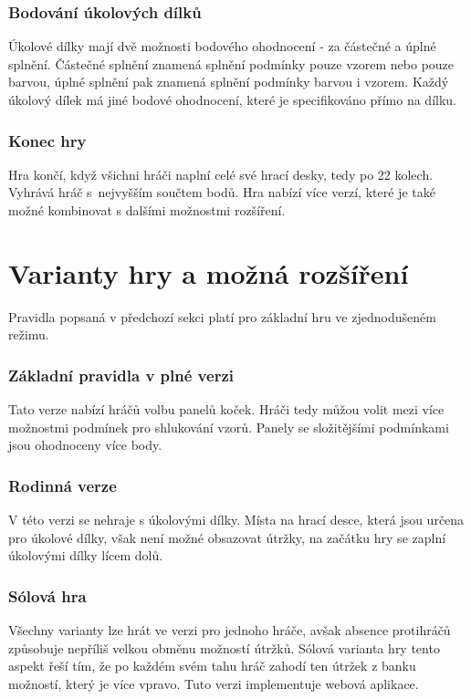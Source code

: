 \subsubsection*{Bodování úkolových dílků}
Úkolové dílky mají dvě možnosti bodového ohodnocení - za částečné a úplné splnění. Částečné splnění znamená splnění podmínky pouze vzorem nebo pouze barvou, úplné splnění pak znamená splnění podmínky barvou i vzorem. Každý úkolový dílek má jiné bodové ohodnocení, které je specifikováno přímo na dílku.


\subsubsection*{Konec hry}

Hra končí, když všichni hráči naplní celé své hrací desky, tedy po 22 kolech. Vyhrává hráč s~nejvyšším součtem bodů. Hra nabízí více verzí, které je také možné kombinovat s dalšími možnostmi rozšíření.


\section{Varianty hry a možná rozšíření}

Pravidla popsaná v předchozí sekci platí pro základní hru ve zjednodušeném režimu.

\subsubsection*{Základní pravidla v plné verzi}
Tato verze nabízí hráčů volbu panelů koček. Hráči tedy můžou volit mezi více možnostmi podmínek pro shlukování vzorů. Panely se složitějšími podmínkami jsou ohodnoceny více body.

\subsubsection*{Rodinná verze}
V této verzi se nehraje s úkolovými dílky. Místa na hrací desce, která jsou určena pro úkolové dílky, však není možné obsazovat útržky, na začátku hry se zaplní úkolovými dílky lícem dolů.

\subsubsection*{Sólová hra}
Všechny varianty lze hrát ve verzi pro jednoho hráče, avšak absence protihráčů způsobuje nepříliš velkou obměnu možností útržků. Sólová varianta hry tento aspekt řeší tím, že po každém svém tahu hráč zahodí ten útržek z banku možností, který je více vpravo. Tuto verzi implementuje webová aplikace. 

